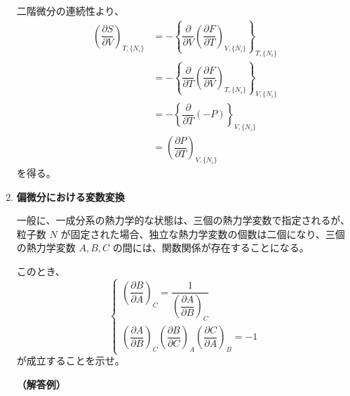 \documentclass[uplatex,dvipdfmx,a4paper,11pt]{jsarticle}
\begin{document}
\begin{appendix}
\begin{enumerate}
二階微分の連続性より、
\begin{align*}
\left(\dfrac{\partial S}{\partial V} \right)_{T, \{N_i\}}
&= - \left\{ \dfrac{\partial }{\partial V}\left(\dfrac{\partial F}{\partial T} \right)_{V, \{N_i\}} \right\}_{T, \{N_i\}} \\[10pt]
&= - \left\{ \dfrac{\partial }{\partial T}\left(\dfrac{\partial F}{\partial V} \right)_{T, \{N_i\}} \right\}_{V, \{N_i\}} \\[10pt]
&= - \left\{ \dfrac{\partial }{\partial T} (-P) \right\}_{V, \{N_i\}} \\[10pt]
&= \left(\dfrac{\partial P}{\partial T} \right)_{V, \{N_i\}}
\end{align*}
を得る。

\item 
{\bf 偏微分における変数変換}

一般に、一成分系の熱力学的な状態は、三個の熱力学変数で指定されるが、粒子数 $N$ が固定された場合、独立な熱力学変数の個数は二個になり、三個の熱力学変数 $A, B, C$ の間には、関数関係が存在することになる。

このとき、
\begin{equation*}
\begin{cases}
\left(\dfrac{\partial B}{\partial A} \right)_{C} = \dfrac{1}{ \left( \dfrac{\partial A}{\partial B} \right)_{C} } \\[12pt]
\left(\dfrac{\partial A}{\partial B} \right)_{C} \left(\dfrac{\partial B}{\partial C} \right)_{A} \left(\dfrac{\partial C}{\partial A} \right)_{B} = -1
\end{cases}
\end{equation*}
が成立することを示せ。

{\bf （解答例）}


\end{enumerate}
\end{appendix}
\end{document}

